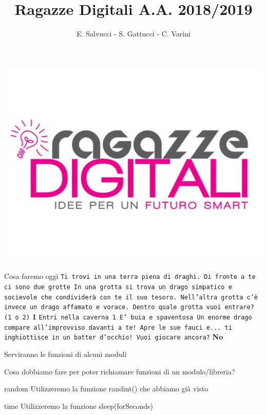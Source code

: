 \documentclass{beamer}
\title[Ragazze Digitali 2019]{Ragazze Digitali A.A. 2018/2019}
\author{E. Salvucci - S. Gattucci - C. Varini}
\date{}
\begin{document}
{\includegraphics[width=\paperwidth,height=\paperheight]{images/ragazze_digitali.jpg}}
\begin{frame}
\end{frame}


\begin{frame}{Cosa faremo oggi}
\texttt{Ti trovi in una terra piena di draghi.\newline
        Di fronte a te ci sono due grotte\newline
        In una grotta si trova un drago simpatico e socievole che condividerà con te il suo tesoro.\newline
        Nell'altra grotta c'è invece un drago affamato e vorace.\newline
        Dentro quale grotta vuoi entrare? (1 o 2)\newline}
\textbf{1\newline}
\texttt{Entri nella caverna 1\newline
        E' buia e spaventosa\newline
        Un enorme drago compare all'improvviso davanti a te! Apre le sue fauci e... ti inghiottisce in un batter d'occhio!\newline
        Vuoi giocare ancora?\newline}
\textbf{No}        
        
\end{frame}

\begin{frame}{Serviranno le funzioni di alcuni moduli}
    
Cosa dobbiamo fare per poter richiamare funzioni di un modulo/libreria? 
\begin{block}{random}
Utilizzeremo la funzione randint() che abbiamo già visto
\end{block}

\begin{block}{time}
Utilizzeremo la funzione sleep(forSeconds)
\end{block}

\end{frame}
\end{document}
